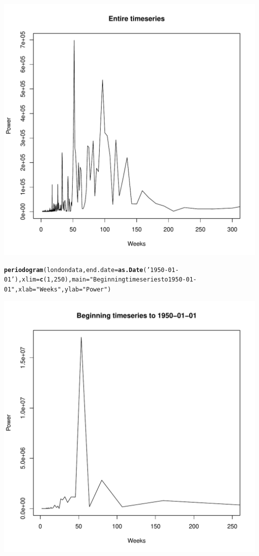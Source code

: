 \documentclass[12pt]{article}\usepackage[]{graphicx}\usepackage[]{color}
\makeatletter
\def\maxwidth{ %
  \ifdim\Gin@nat@width>\linewidth
    \linewidth
  \else
    \Gin@nat@width
  \fi
}
\newcommand{\hlnum}[1]{\textcolor[rgb]{0.686,0.059,0.569}{#1}}%
\newcommand{\hlstr}[1]{\textcolor[rgb]{0.192,0.494,0.8}{#1}}%
\newcommand{\hlstd}[1]{\textcolor[rgb]{0.345,0.345,0.345}{#1}}%
\newcommand{\hlkwc}[1]{\textcolor[rgb]{0.333,0.667,0.333}{#1}}%
\newcommand{\hlkwd}[1]{\textcolor[rgb]{0.737,0.353,0.396}{\textbf{#1}}}%
\newenvironment{kframe}{%
 \def\at@end@of@kframe{}%
 \ifinner\ifhmode%
  \def\at@end@of@kframe{\end{minipage}}%
  \begin{minipage}{\columnwidth}%
 \fi\fi%
 \def\FrameCommand##1{\hskip\@totalleftmargin \hskip-\fboxsep
 \colorbox{shadecolor}{##1}\hskip-\fboxsep
     \hskip-\linewidth \hskip-\@totalleftmargin \hskip\columnwidth}%
 \MakeFramed {\advance\hsize-\width
   \@totalleftmargin\z@ \linewidth\hsize
   \@setminipage}}%
 {\par\unskip\endMakeFramed%
 \at@end@of@kframe}
\newenvironment{knitrout}{}{} %
\makeatother
\begin{document}
\begin{enumerate}[(a)]
\begin{knitrout}
\includegraphics[width=\maxwidth]{figure/unnamed-chunk-5-3} 
\begin{kframe}\begin{alltt}
\hlkwd{periodogram}\hlstd{(londondata,}\hlkwc{end.date}\hlstd{=}\hlkwd{as.Date}\hlstd{(}\hlstr{'1950-01-01'}\hlstd{),}\hlkwc{xlim}\hlstd{=}\hlkwd{c}\hlstd{(}\hlnum{1}\hlstd{,}\hlnum{250}\hlstd{),} \hlkwc{main}\hlstd{=}\hlstr{"Beginning timeseries to 1950-01-01"}\hlstd{,}\hlkwc{xlab}\hlstd{=}\hlstr{"Weeks"}\hlstd{,} \hlkwc{ylab}\hlstd{=}\hlstr{"Power"}\hlstd{)}
\end{alltt}
\end{kframe}
\includegraphics[width=\maxwidth]{figure/unnamed-chunk-5-4} 

\end{knitrout}
\end{enumerate}
\end{document}

